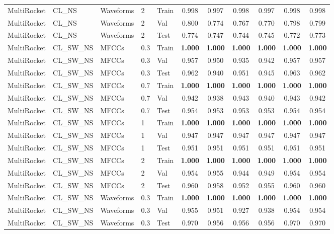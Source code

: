 \begin{landscape}
\begin{longtable}{|l|l|l|l|l|c|c|c|c|c|c|}
MultiRocket & CL\_NS & Waveforms & 2 & Train & 0.998 & 0.997 & 0.998 & 0.997 & 0.998 & 0.998 \\
MultiRocket & CL\_NS & Waveforms & 2 & Val & 0.800 & 0.774 & 0.767 & 0.770 & 0.798 & 0.799 \\
MultiRocket & CL\_NS & Waveforms & 2 & Test & 0.774 & 0.747 & 0.744 & 0.745 & 0.772 & 0.773 \\
MultiRocket & CL\_SW\_NS & MFCCs & 0.3 & Train & \textbf{1.000} & \textbf{1.000} & \textbf{1.000} & \textbf{1.000} & \textbf{1.000} & \textbf{1.000} \\
MultiRocket & CL\_SW\_NS & MFCCs & 0.3 & Val & 0.957 & 0.950 & 0.935 & 0.942 & 0.957 & 0.957 \\
MultiRocket & CL\_SW\_NS & MFCCs & 0.3 & Test & 0.962 & 0.940 & 0.951 & 0.945 & 0.963 & 0.962 \\
MultiRocket & CL\_SW\_NS & MFCCs & 0.7 & Train & \textbf{1.000} & \textbf{1.000} & \textbf{1.000} & \textbf{1.000} & \textbf{1.000} & \textbf{1.000} \\
MultiRocket & CL\_SW\_NS & MFCCs & 0.7 & Val & 0.942 & 0.938 & 0.943 & 0.940 & 0.943 & 0.942 \\
MultiRocket & CL\_SW\_NS & MFCCs & 0.7 & Test & 0.954 & 0.953 & 0.953 & 0.953 & 0.954 & 0.954 \\
MultiRocket & CL\_SW\_NS & MFCCs & 1 & Train & \textbf{1.000} & \textbf{1.000} & \textbf{1.000} & \textbf{1.000} & \textbf{1.000} & \textbf{1.000} \\
MultiRocket & CL\_SW\_NS & MFCCs & 1 & Val & 0.947 & 0.947 & 0.947 & 0.947 & 0.947 & 0.947 \\
MultiRocket & CL\_SW\_NS & MFCCs & 1 & Test & 0.951 & 0.951 & 0.951 & 0.951 & 0.951 & 0.951 \\
MultiRocket & CL\_SW\_NS & MFCCs & 2 & Train & \textbf{1.000} & \textbf{1.000} & \textbf{1.000} & \textbf{1.000} & \textbf{1.000} & \textbf{1.000} \\
MultiRocket & CL\_SW\_NS & MFCCs & 2 & Val & 0.954 & 0.955 & 0.944 & 0.949 & 0.954 & 0.954 \\
MultiRocket & CL\_SW\_NS & MFCCs & 2 & Test & 0.960 & 0.958 & 0.952 & 0.955 & 0.960 & 0.960 \\
MultiRocket & CL\_SW\_NS & Waveforms & 0.3 & Train & \textbf{1.000} & \textbf{1.000} & \textbf{1.000} & \textbf{1.000} & \textbf{1.000} & \textbf{1.000} \\
MultiRocket & CL\_SW\_NS & Waveforms & 0.3 & Val & 0.955 & 0.951 & 0.927 & 0.938 & 0.954 & 0.954 \\
MultiRocket & CL\_SW\_NS & Waveforms & 0.3 & Test & 0.970 & 0.956 & 0.956 & 0.956 & 0.970 & 0.970 \\

\end{longtable}
\end{landscape}
